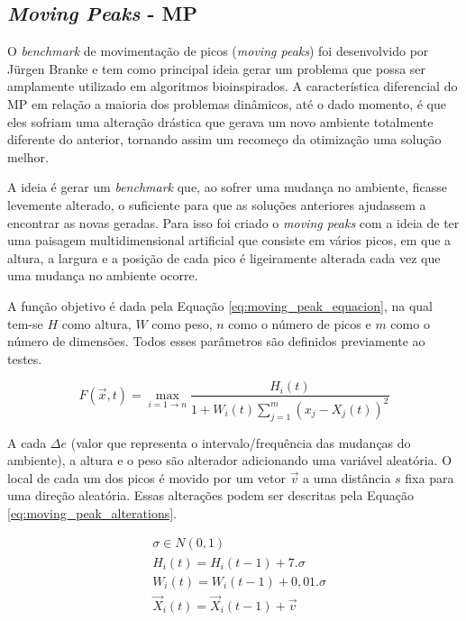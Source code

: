 \subsection{\textit{Moving Peaks} - MP}
\label{sec:moving_peaks}

O \textit{benchmark} de movimentação de picos (\textit{moving peaks}) foi desenvolvido por Jürgen Branke \cite{moving_peak_1999} e tem como principal ideia gerar um problema que possa ser amplamente utilizado em algoritmos bioinspirados. A característica diferencial do MP em relação a maioria dos problemas dinâmicos, até o dado momento, é que eles sofriam uma alteração drástica que gerava um novo ambiente totalmente diferente do anterior, tornando assim um recomeço da otimização uma solução melhor.

A ideia é gerar um \textit{benchmark} que, ao sofrer uma mudança no ambiente, ficasse levemente alterado, o suficiente para que as soluções anteriores ajudassem a encontrar as novas geradas. Para isso foi criado o \textit{moving peaks} com a ideia de ter uma paisagem multidimensional artificial que consiste em vários picos, em que a altura, a largura e a posição de cada pico é ligeiramente alterada cada vez que uma mudança no ambiente ocorre.

A função objetivo é dada pela Equação \ref{eq:moving_peak_equacion}, na qual tem-se $ H $ como altura, $ W $ como peso, $ n $ como o número de picos e $ m $ como o número de dimensões. Todos esses parâmetros são definidos previamente ao testes.

\begin{equation}
\label{eq:moving_peak_equacion}
F(\vec{x},t) = \max_{i = 1 \to n} \frac {H_i(t)}{1 + W_i(t)\sum_{j=1}^{m} (x_j - X_j(t))^2}
\end{equation}

A cada $\Delta e$ (valor que representa o intervalo/frequência das mudanças do ambiente), a altura e o peso são alterador adicionando uma variável aleatória. O local de cada um dos picos é movido por um vetor $\vec{v}$ a uma distância $ s $ fixa para uma direção aleatória. Essas alterações podem ser descritas pela Equação \ref{eq:moving_peak_alterations}.

\begin{equation}
\label{eq:moving_peak_alterations}
\begin{split}
& \sigma \in N(0,1) \\
& H_i(t) = H_i(t-1) + 7.\sigma \\
& W_i(t) = W_i(t-1) + 0,01.\sigma \\
& \vec{X}_i(t) = \vec{X}_i(t-1) + \vec{v}
\end{split}
\end{equation}


